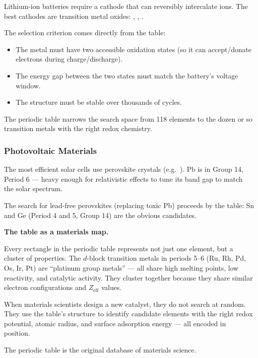 \documentclass[12pt, a4paper]{book}
\begin{document}
Lithium-ion batteries require a cathode that can reversibly
intercalate  ions.
The best cathodes are transition metal oxides:
, , .

The selection criterion comes directly from the table:
\begin{itemize}[nosep, leftmargin=2em]
  \item The metal must have two accessible oxidation states
        (so it can accept/donate electrons during charge/discharge).
  \item The energy gap between the two states must match
        the battery's voltage window.
  \item The structure must be stable over thousands of cycles.
\end{itemize}

The periodic table narrows the search space from 118 elements
to the dozen or so transition metals with the right redox chemistry.

\subsubsection{Photovoltaic Materials}

The most efficient solar cells use  perovskite crystals
(e.g.\ ).
Pb is in Group 14, Period 6 --- heavy enough for
relativistic effects to tune its band gap to match
the solar spectrum.

The search for lead-free perovskites (replacing toxic Pb)
proceeds by the table: Sn and Ge (Period 4 and 5, Group 14)
are the obvious candidates.

\begin{discoverybox}
\textbf{The table as a materials map.}

Every rectangle in the periodic table represents
not just one element, but a cluster of properties.
The $d$-block transition metals in periods 5--6
(Ru, Rh, Pd, Os, Ir, Pt) are ``platinum group metals'' ---
all share high melting points, low reactivity,
and catalytic activity.
They cluster together because they share similar
electron configurations and $Z_\text{eff}$ values.

When materials scientists design a new catalyst, they
do not search at random.
They use the table's structure to identify candidate
elements with the right redox potential, atomic radius,
and surface adsorption energy --- all encoded in position.

The periodic table is the original database of materials science.
\end{discoverybox}
\end{document}
